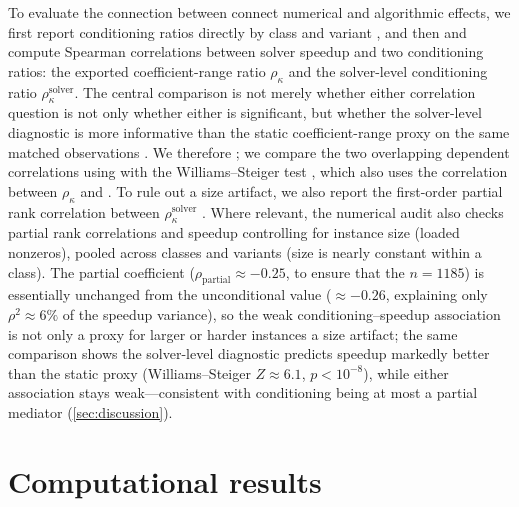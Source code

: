 \documentclass[AMA,Times1COL]{WileyNJDv5} %
\providecommand{\DIFadd}[1]{{\protect\color{blue} \sf #1}} %
\providecommand{\DIFdel}[1]{{\protect\color{red} \scriptsize #1}} %
\providecommand{\DIFaddbegin}{} %
\providecommand{\DIFaddend}{} %
\providecommand{\DIFdelbegin}{} %
\providecommand{\DIFdelend}{} %
\begin{document}
To \DIFdelbegin \DIFdel{evaluate the connection between }\DIFdelend \DIFaddbegin \DIFadd{connect }\DIFaddend numerical and algorithmic effects, we \DIFdelbegin \DIFdel{first }\DIFdelend report conditioning ratios \DIFdelbegin \DIFdel{directly }\DIFdelend by class and variant
\DIFdelbegin \DIFdel{, and then }\DIFdelend \DIFaddbegin \DIFadd{and }\DIFaddend compute Spearman correlations between solver speedup and two \DIFdelbegin \DIFdel{conditioning }\DIFdelend ratios: the exported
coefficient-range ratio $\rho_\kappa$ and the solver-level \DIFdelbegin \DIFdel{conditioning }\DIFdelend ratio $\rho_\kappa^{\mathrm{solver}}$.
The \DIFdelbegin \DIFdel{central comparison is not merely whether either correlation }\DIFdelend \DIFaddbegin \DIFadd{question is not only whether either }\DIFaddend is significant, but whether the solver-level diagnostic is
more informative than the static \DIFdelbegin \DIFdel{coefficient-range }\DIFdelend proxy on the same matched observations\DIFdelbegin \DIFdel{. We therefore
}\DIFdelend \DIFaddbegin \DIFadd{; we }\DIFaddend compare the two
overlapping dependent correlations \DIFdelbegin \DIFdel{using }\DIFdelend \DIFaddbegin \DIFadd{with }\DIFaddend the Williams--Steiger test\DIFdelbegin \DIFdel{,
which also uses the correlation between $\rho_\kappa$ and
}\DIFdelend \DIFaddbegin \DIFadd{. To rule out a size artifact,
we also report the first-order partial rank correlation between }\DIFaddend $\rho_\kappa^{\mathrm{solver}}$ \DIFdelbegin \DIFdel{. Where relevant, the numerical audit also checks partial
rank correlations }\DIFdelend \DIFaddbegin \DIFadd{and
speedup }\DIFaddend controlling for instance size \DIFaddbegin \DIFadd{(loaded nonzeros), pooled across classes and variants (size
is nearly constant within a class). The partial coefficient
($\rho_{\mathrm{partial}}\approx-0.25$}\DIFaddend , \DIFdelbegin \DIFdel{to ensure that the }\DIFdelend \DIFaddbegin \DIFadd{$n=1185$) is essentially unchanged from the unconditional
value ($\approx-0.26$, explaining only $\rho^2\approx6\%$ of the speedup variance), so the
weak conditioning--speedup }\DIFaddend association is not \DIFdelbegin \DIFdel{only
a proxy for larger or harder instances}\DIFdelend \DIFaddbegin \DIFadd{a size artifact; the
same comparison shows the solver-level diagnostic predicts speedup markedly better than the static
proxy (Williams--Steiger $Z\approx6.1$, $p<10^{-8}$), while either association stays
weak---consistent with conditioning being at most a partial mediator (\cref{sec:discussion})}\DIFaddend .

\section{Computational results}
\label{sec:results}
\end{document}
